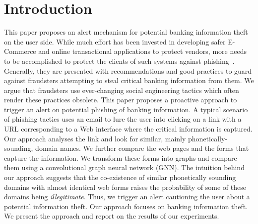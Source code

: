 \section{Introduction} %
\label{sec:introduction}

  This paper proposes an alert mechanism for potential banking information theft on the user side. While much effort has been invested in developing safer E-Commerce and online transactional applications to protect vendors, more needs to be accomplished to protect the clients of such systems against phishing~\cite{nicholas:2024,stanley:2023}. Generally, they are presented with recommendations and good practices to guard against fraudsters attempting to steal critical banking information from them. We argue that fraudsters use ever-changing social engineering tactics which often render these practices obsolete. This paper proposes a proactive approach to trigger an alert on potential phishing of banking information.  A typical scenario of phishing tactics uses an email to lure the user into clicking on a link with a URL corresponding to a Web interface where the critical information is captured. Our approach analyses the link and look for similar, mainly phonetically-sounding,  domain names. We further compare the web pages and the forms that capture the information. We transform these forms into graphs and compare them using a convolutional graph neural network (GNN). The intuition behind our approach suggests that the co-existence of similar phonetically sounding domains with almost identical web forms raises the probability of some of these domains being \emph{illegitimate}. Thus, we trigger an alert cautioning the user about a potential information theft. Our approach focuses on banking information theft. We present the approach and report on the results of our experiments.

